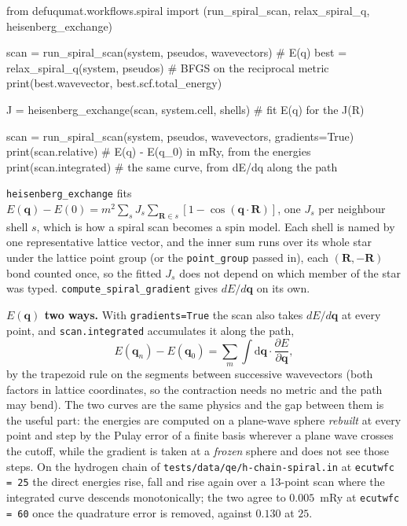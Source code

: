 \documentclass[11pt,a4paper]{article}
\newcommand{\code}[1]{\texttt{\small #1}}
\begin{document}
\begin{pycode}
from defuqumat.workflows.spiral import (run_spiral_scan, relax_spiral_q,
                                       heisenberg_exchange)

scan = run_spiral_scan(system, pseudos, wavevectors)   # E(q)
best = relax_spiral_q(system, pseudos)   # BFGS on the reciprocal metric
print(best.wavevector, best.scf.total_energy)

J = heisenberg_exchange(scan, system.cell, shells)   # fit E(q) for the J(R)

scan = run_spiral_scan(system, pseudos, wavevectors, gradients=True)
print(scan.relative)     # E(q) - E(q_0) in mRy, from the energies
print(scan.integrated)   # the same curve, from dE/dq along the path
\end{pycode}

\code{heisenberg\_exchange} fits
$E(\mathbf q) - E(0) = m^2 \sum_{s} J_s \sum_{\mathbf R \in s}[1 - \cos(\mathbf q\cdot\mathbf R)]$,
one $J_s$ per neighbour shell $s$, which is how a spiral scan becomes a spin
model. Each shell is named by one representative lattice vector, and the inner
sum runs over its whole star under the lattice point group (or the
\code{point\_group} passed in), each $(\mathbf R, -\mathbf R)$ bond counted
once, so the fitted $J_s$ does not depend on which member of the star was
typed.
\code{compute\_spiral\_gradient} gives $dE/d\mathbf q$ on its own.

\textbf{$E(\mathbf q)$ two ways.} With \code{gradients=True} the scan also takes
$dE/d\mathbf q$ at every point, and \code{scan.integrated} accumulates it along
the path,
\begin{equation*}
E(\mathbf q_n) - E(\mathbf q_0)
  = \sum_m \int \mathrm d\mathbf q\cdot\frac{\partial E}{\partial\mathbf q},
\end{equation*}
by the trapezoid rule on the segments between successive wavevectors (both
factors in lattice coordinates, so the contraction needs no metric and the path
may bend). The two curves are the same physics and the gap between them is the
useful part: the energies are computed on a plane-wave sphere \emph{rebuilt} at
every point and step by the Pulay error of a finite basis wherever a plane wave
crosses the cutoff, while the gradient is taken at a \emph{frozen} sphere and
does not see those steps. On the hydrogen chain of
\code{tests/data/qe/h-chain-spiral.in} at \code{ecutwfc = 25} the direct
energies rise, fall and rise again over a 13-point scan where the integrated
curve descends monotonically; the two agree to $0.005$~mRy at
\code{ecutwfc = 60} once the quadrature error is removed, against $0.130$ at
$25$.
\end{document}
